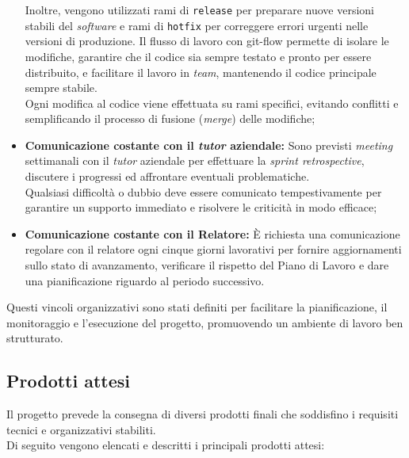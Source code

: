 \begin{itemize}
    Inoltre, vengono utilizzati rami di \texttt{release} per preparare nuove versioni stabili del \textit{software} e rami di \texttt{hotfix} per correggere errori urgenti nelle versioni di produzione.
    Il flusso di lavoro con \gls{git-flow} permette di isolare le modifiche, garantire che il codice sia sempre testato e pronto per essere distribuito, e facilitare il lavoro in \textit{team}, mantenendo il codice principale sempre stabile.\\
    Ogni modifica al codice viene effettuata su rami specifici, evitando conflitti e semplificando il processo di fusione (\textit{merge}) delle modifiche;
    \item \textbf{Comunicazione costante con il \textit{tutor} aziendale:} Sono previsti \textit{meeting} settimanali con il \textit{tutor} aziendale per effettuare la \textit{sprint retrospective}, discutere i progressi ed affrontare eventuali problematiche.\\
    Qualsiasi difficoltà o dubbio deve essere comunicato tempestivamente per garantire un supporto immediato e risolvere le criticità in modo efficace;
    \item \textbf{Comunicazione costante con il Relatore:} È richiesta una comunicazione regolare con il relatore ogni cinque giorni lavorativi per fornire aggiornamenti sullo stato di avanzamento, verificare il rispetto del Piano di Lavoro e dare una pianificazione riguardo al periodo successivo.\\
\end{itemize}

\noindent Questi vincoli organizzativi sono stati definiti per facilitare la pianificazione, il monitoraggio e l’esecuzione del progetto, promuovendo un ambiente di lavoro ben strutturato.

\subsection{Prodotti attesi}
\label{subsec:prodotti-attesi}

Il progetto prevede la consegna di diversi prodotti finali che soddisfino i requisiti tecnici e organizzativi stabiliti.\\

\noindent Di seguito vengono elencati e descritti i principali prodotti attesi:

